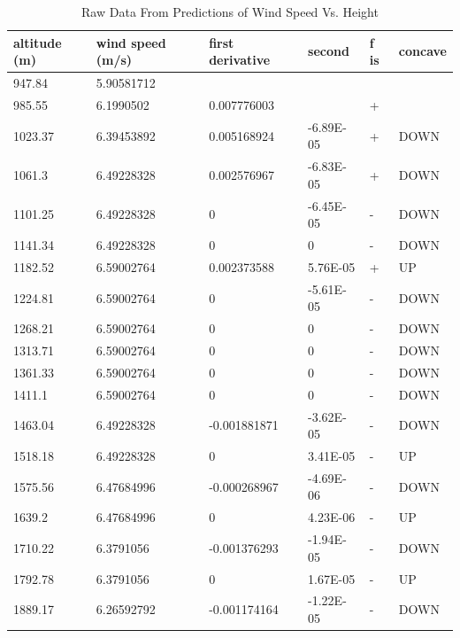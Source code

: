 \documentclass{article}
\begin{document}
\begin{table}[]
\centering
\caption{Raw Data From Predictions of Wind Speed Vs. Height}
\label{joshtable1}
\begin{tabular}{@{}llllll@{}}
\toprule
altitude (m) & wind speed (m/s) & first derivative & second    & f is & concave \\ \midrule
947.84       & 5.90581712       &                  &           &      &         \\
985.55       & 6.1990502        & 0.007776003      &           & +    &         \\
1023.37      & 6.39453892       & 0.005168924      & -6.89E-05 & +    & DOWN    \\
1061.3       & 6.49228328       & 0.002576967      & -6.83E-05 & +    & DOWN    \\
1101.25      & 6.49228328       & 0                & -6.45E-05 & -    & DOWN    \\
1141.34      & 6.49228328       & 0                & 0         & -    & DOWN    \\
1182.52      & 6.59002764       & 0.002373588      & 5.76E-05  & +    & UP      \\
1224.81      & 6.59002764       & 0                & -5.61E-05 & -    & DOWN    \\
1268.21      & 6.59002764       & 0                & 0         & -    & DOWN    \\
1313.71      & 6.59002764       & 0                & 0         & -    & DOWN    \\
1361.33      & 6.59002764       & 0                & 0         & -    & DOWN    \\
1411.1       & 6.59002764       & 0                & 0         & -    & DOWN    \\
1463.04      & 6.49228328       & -0.001881871     & -3.62E-05 & -    & DOWN    \\
1518.18      & 6.49228328       & 0                & 3.41E-05  & -    & UP      \\
1575.56      & 6.47684996       & -0.000268967     & -4.69E-06 & -    & DOWN    \\
1639.2       & 6.47684996       & 0                & 4.23E-06  & -    & UP      \\
1710.22      & 6.3791056        & -0.001376293     & -1.94E-05 & -    & DOWN    \\
1792.78      & 6.3791056        & 0                & 1.67E-05  & -    & UP      \\
1889.17      & 6.26592792       & -0.001174164     & -1.22E-05 & -    & DOWN    \\

\end{tabular}
\end{table}
\end{document}
